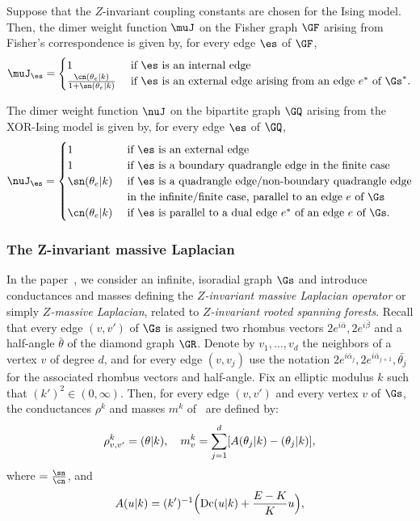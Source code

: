 \documentclass[a4paper,twoside,11pt]{article}
\begin{document}
Suppose that the $Z$-invariant coupling constants are chosen for the Ising model. Then, the dimer weight function $\muJ$ 
on the Fisher graph $\GF$ arising from Fisher's correspondence is given by, for every edge $\es$ of $\GF$,
\begin{equation}\label{equ:def_mu_Zinv}
\muJ_\es=
\begin{cases}
1&\text{ if $\es$ is an internal edge}\\
\frac{\cn(\theta_e|k)}{1+\sn(\theta_e|k)}&\text{ if $\es$ is an external edge arising from an edge $e^*$ of $\Gs^*$}.
\end{cases}
\end{equation}
 
The dimer weight function $\nuJ$ on the bipartite graph $\GQ$ arising from the XOR-Ising model is given by, for every edge $\es$ of $\GQ$,
\begin{equation}\label{eq:def_nu_Zinv}
\nuJ_{\es}=
\begin{cases}
1&\text{ if $\es$ is an external edge}\\
1&\text{ if $\es$ is a boundary quadrangle edge in the finite case}\\
\sn(\theta_e|k)&\text{ if $\es$ is a quadrangle edge/non-boundary quadrangle edge}\\
&\text{ in the infinite/finite case, parallel to an edge $e$ of $\Gs$}\\
\cn(\theta_e|k)&\text{ if $\es$ is parallel to a dual edge $e^*$ of an edge $e$ of $\Gs$}.
\end{cases}
\end{equation}

\subsubsection{The Z-invariant massive Laplacian}\label{sec:def_Lapmass_0}

In the paper~\cite{BdTR1}, we consider an infinite, isoradial graph $\Gs$ and introduce conductances and masses defining the 
\emph{$Z$-invariant massive Laplacian operator} or simply \emph{$Z$-massive Laplacian}, related to \emph{$Z$-invariant rooted spanning forests}.
Recall 
that every edge $(v,v')$ of $\Gs$ is assigned two rhombus vectors $2e^{i\bar{\alpha}},2e^{i\bar{\beta}}$ and a half-angle $\bar{\theta}$
of the diamond graph $\GR$. Denote by $v_1,\dots,v_d$ the neighbors of a vertex $v$ of degree $d$, and for every edge $(v,v_j)$ use the notation
$2e^{i\bar{\alpha}_j},2e^{i\bar{\alpha}_{j+1}},\bar{\theta_j}$ for the associated rhombus vectors and half-angle. Fix an elliptic modulus $k$ such that 
$(k')^2\in(0,\infty)$. Then, for every edge $(v,v')$ and every vertex $v$ of $\Gs$, the conductances $\rho^k$ and masses $m^k$ of~\cite{BdTR1}
are defined by:
\begin{equation*}
\rho^k_{v,v'}=\sc(\theta|k),\quad 
m^k_v=\sum_{j=1}^d [A(\theta_j|k)-\sc(\theta_j|k)],
\end{equation*}
where $\sc=\frac{\sn}{\cn}$, and 
\[A(u|k)=(k')^{-1}\Bigl(\mathrm{Dc}(u|k)+\frac{E-K}{K}u\Bigr),\]
\end{document}
